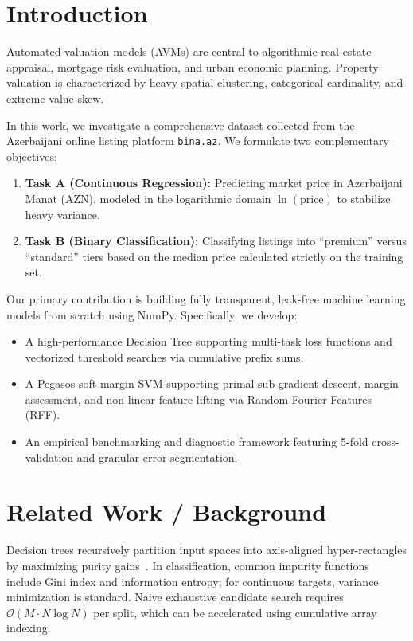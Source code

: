\documentclass[10pt,twocolumn,a4paper]{article}
\begin{document}
\section{Introduction}
Automated valuation models (AVMs) are central to algorithmic real-estate appraisal, mortgage risk evaluation, and urban economic planning. Property valuation is characterized by heavy spatial clustering, categorical cardinality, and extreme value skew. 

In this work, we investigate a comprehensive dataset collected from the Azerbaijani online listing platform \texttt{bina.az}. We formulate two complementary objectives:
\begin{enumerate}
    \item \textbf{Task A (Continuous Regression):} Predicting market price in Azerbaijani Manat (AZN), modeled in the logarithmic domain $\ln(\text{price})$ to stabilize heavy variance.
    \item \textbf{Task B (Binary Classification):} Classifying listings into ``premium'' versus ``standard'' tiers based on the median price calculated strictly on the training set.
\end{enumerate}

Our primary contribution is building fully transparent, leak-free machine learning models from scratch using NumPy. Specifically, we develop:
\begin{itemize}
    \item A high-performance Decision Tree supporting multi-task loss functions and vectorized threshold searches via cumulative prefix sums.
    \item A Pegasos soft-margin SVM supporting primal sub-gradient descent, margin assessment, and non-linear feature lifting via Random Fourier Features (RFF).
    \item An empirical benchmarking and diagnostic framework featuring 5-fold cross-validation and granular error segmentation.
\end{itemize}

\section{Related Work / Background}
Decision trees recursively partition input spaces into axis-aligned hyper-rectangles by maximizing purity gains~\cite{quinlan1986}. In classification, common impurity functions include Gini index and information entropy; for continuous targets, variance minimization is standard. Naive exhaustive candidate search requires $\mathcal{O}(M \cdot N \log N)$ per split, which can be accelerated using cumulative array indexing.
\end{document}
